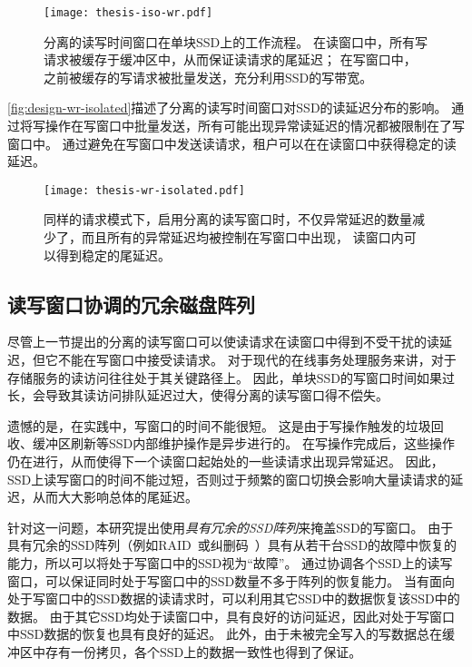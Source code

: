 \begin{figure}[h]
  \centering
  \texttt{[image: thesis-iso-wr.pdf]}
  \caption{
        分离的读写时间窗口在单块SSD上的工作流程。
        在读窗口中，所有写请求被缓存于缓冲区中，从而保证读请求的尾延迟；
        在写窗口中，之前被缓存的写请求被批量发送，充分利用SSD的写带宽。
      }
  \label{fig:design-iso-wr}
\end{figure}

\autoref{fig:design-wr-isolated}描述了分离的读写时间窗口对SSD的读延迟分布的影响。
通过将写操作在写窗口中批量发送，所有可能出现异常读延迟的情况都被限制在了写窗口中。
通过避免在写窗口中发送读请求，租户可以在在读窗口中获得稳定的读延迟。

\begin{figure}[h]
  \centering
  \texttt{[image: thesis-wr-isolated.pdf]}
  \caption{
        同样的请求模式下，启用分离的读写窗口时，不仅异常延迟的数量减少了，而且所有的异常延迟均被控制在写窗口中出现，
        读窗口内可以得到稳定的尾延迟。
      }
  \label{fig:design-wr-isolated}
\end{figure}

\subsection{读写窗口协调的冗余磁盘阵列}
\label{sec:design-array-composition}

尽管上一节提出的分离的读写窗口可以使读请求在读窗口中得到不受干扰的读延迟，但它不能在写窗口中接受读请求。
对于现代的在线事务处理服务来讲，对于存储服务的读访问往往处于其关键路径上。
因此，单块SSD的写窗口时间如果过长，会导致其读访问排队延迟过大，使得分离的读写窗口得不偿失。

遗憾的是，在实践中，写窗口的时间不能很短。
这是由于写操作触发的垃圾回收、缓冲区刷新等SSD内部维护操作是异步进行的。
在写操作完成后，这些操作仍在进行，从而使得下一个读窗口起始处的一些读请求出现异常延迟。
因此，SSD上读写窗口的时间不能过短，否则过于频繁的窗口切换会影响大量读请求的延迟，从而大大影响总体的尾延迟。

针对这一问题，本研究提出使用\textit{具有冗余的SSD阵列}来掩盖SSD的写窗口。
由于具有冗余的SSD阵列（例如RAID~\cite{patterson1988case}或纠删码~\cite{huang2012erasure}）具有从若干台SSD的故障中恢复的能力，所以可以将处于写窗口中的SSD视为“故障”。
通过协调各个SSD上的读写窗口，可以保证同时处于写窗口中的SSD数量不多于阵列的恢复能力。
当有面向处于写窗口中的SSD数据的读请求时，可以利用其它SSD中的数据恢复该SSD中的数据。
由于其它SSD均处于读窗口中，具有良好的访问延迟，因此对处于写窗口中SSD数据的恢复也具有良好的延迟。
此外，由于未被完全写入的写数据总在缓冲区中存有一份拷贝，各个SSD上的数据一致性也得到了保证。

